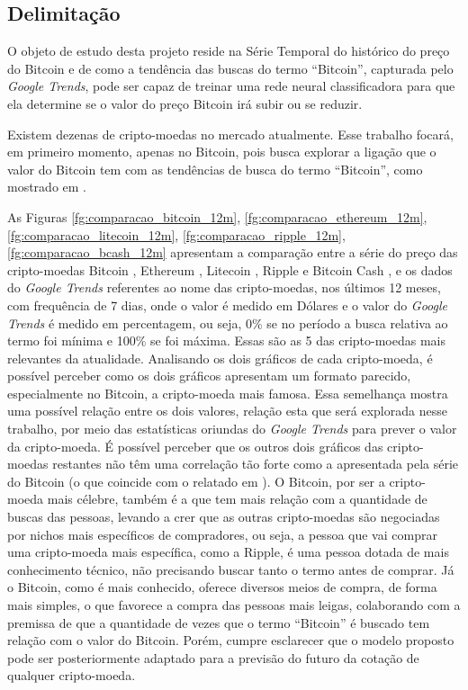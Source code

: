 \subsection{Delimitação}

O objeto de estudo desta projeto reside na Série Temporal do histórico do preço do Bitcoin e de como a tendência das buscas do termo ``Bitcoin'', capturada pelo \textit{Google Trends}, pode ser capaz de treinar uma rede neural classificadora para que ela determine se o valor do preço Bitcoin irá subir ou se reduzir.

Existem dezenas de cripto-moedas no mercado atualmente. Esse trabalho focará, em primeiro momento, apenas no Bitcoin, pois busca explorar a ligação que o valor do Bitcoin tem com as tendências de busca do termo ``Bitcoin'', como mostrado em \cite{matta2015bitcoin}. 

As Figuras \ref{fg:comparacao_bitcoin_12m}, \ref{fg:comparacao_ethereum_12m}, \ref{fg:comparacao_litecoin_12m}, \ref{fg:comparacao_ripple_12m}, \ref{fg:comparacao_bcash_12m} apresentam a comparação entre a série do preço das cripto-moedas Bitcoin \cite{nakamoto2008bitcoin}, Ethereum \cite{Ethereum}, Litecoin \cite{Litecoin}, Ripple \cite{Ripple} e Bitcoin Cash \cite{BitcoinCash}, e os dados do \textit{Google Trends} referentes ao nome das cripto-moedas, nos últimos 12 meses, com frequência de 7 dias, onde o valor é medido em Dólares e o valor do \textit{Google Trends} é medido em percentagem, ou seja, 0\% se no período a busca relativa ao termo foi mínima e 100\% se foi máxima. Essas são as 5 das cripto-moedas mais relevantes da atualidade. 
Analisando os dois gráficos de cada cripto-moeda, é possível perceber como os dois gráficos apresentam um formato parecido, especialmente no Bitcoin, a cripto-moeda mais famosa. Essa semelhança mostra uma possível relação entre os dois valores, relação esta que será explorada nesse trabalho, por meio das estatísticas oriundas do \textit{Google Trends} para prever o valor da cripto-moeda. É possível perceber que os outros dois gráficos das cripto-moedas restantes não têm uma correlação tão forte como a apresentada pela série do Bitcoin (o que coincide com o relatado em \cite{mcnally2016predicting}). O Bitcoin, por ser a cripto-moeda mais célebre, também é a que tem mais relação com a quantidade de buscas das pessoas, levando a crer que as outras cripto-moedas são negociadas por nichos mais específicos de compradores, ou seja, a pessoa que vai comprar uma cripto-moeda mais específica, como a Ripple, é uma pessoa dotada de mais conhecimento técnico, não precisando buscar tanto o termo antes de comprar. Já o Bitcoin, como é mais conhecido, oferece diversos meios de compra, de forma mais simples, o que favorece a compra das pessoas mais leigas, colaborando com a premissa de que a quantidade de vezes que o termo ``Bitcoin'' é buscado tem relação com o valor do Bitcoin. Porém, cumpre esclarecer que o modelo proposto pode ser posteriormente adaptado para a previsão do futuro da cotação de qualquer cripto-moeda.

